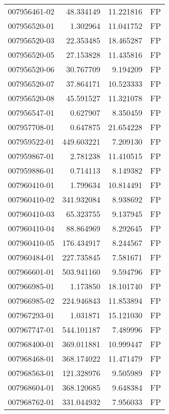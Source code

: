 \begin{tabular}{lrrl}
007956461-02 &   48.334149 &      11.221816 &   FP \\
007956520-01 &    1.302964 &      11.041752 &   FP \\
007956520-03 &   22.353485 &      18.465287 &   FP \\
007956520-05 &   27.153828 &      11.435816 &   FP \\
007956520-06 &   30.767709 &       9.194209 &   FP \\
007956520-07 &   37.864171 &      10.523333 &   FP \\
007956520-08 &   45.591527 &      11.321078 &   FP \\
007956547-01 &    0.627907 &       8.350459 &   FP \\
007957708-01 &    0.647875 &      21.654228 &   FP \\
007959522-01 &  449.603221 &       7.209130 &   FP \\
007959867-01 &    2.781238 &      11.410515 &   FP \\
007959886-01 &    0.714113 &       8.149382 &   FP \\
007960410-01 &    1.799634 &      10.814491 &   FP \\
007960410-02 &  341.932084 &       8.938692 &   FP \\
007960410-03 &   65.323755 &       9.137945 &   FP \\
007960410-04 &   88.864969 &       8.292645 &   FP \\
007960410-05 &  176.434917 &       8.244567 &   FP \\
007960484-01 &  227.735845 &       7.581671 &   FP \\
007966601-01 &  503.941160 &       9.594796 &   FP \\
007966985-01 &    1.173850 &      18.101740 &   FP \\
007966985-02 &  224.946843 &      11.853894 &   FP \\
007967293-01 &    1.031871 &      15.121030 &   FP \\
007967747-01 &  544.101187 &       7.489996 &   FP \\
007968400-01 &  369.011881 &      10.999447 &   FP \\
007968468-01 &  368.174022 &      11.471479 &   FP \\
007968563-01 &  121.328976 &       9.505989 &   FP \\
007968604-01 &  368.120685 &       9.648384 &   FP \\
007968762-01 &  331.044932 &       7.956033 &   FP \\

\end{tabular}

